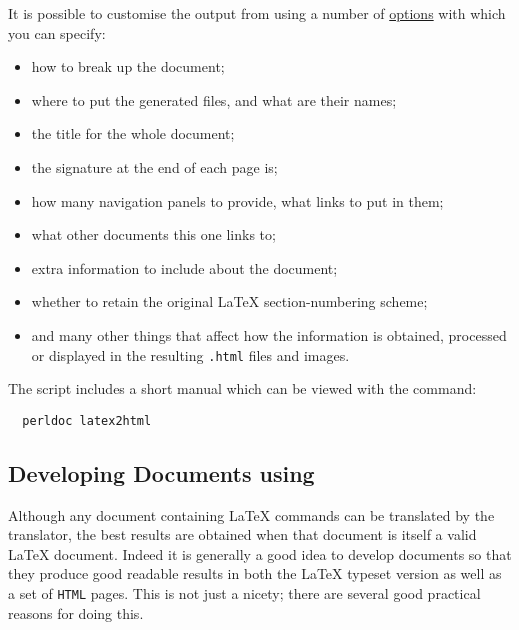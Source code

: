 \medskip
{}\html{\\}\noindent
It is possible to customise the output from \latextohtml{} using a number of 
\hyperref{command-line options}{command-line options (see Section~}{)}{options}
with which you can specify:
\begin{itemize}
\item
how to break up the document; 
\item
where to put the generated files, and what are their names;
\item
the title for the whole document; 
\item
the signature at the end of each page is; 
\item
how many navigation panels to provide, what links to put in them;
\item
what other documents this one links to;
\item 
extra information to include about the document;
\item 
whether to retain the original \LaTeX{} section-numbering scheme;
\item
and many other things that affect how the information is obtained,
processed or displayed in the resulting \texttt{.html} files and images.
\end{itemize}

\medskip
{}\html{\\}\noindent
The \latextohtml{} script includes a short manual
which can be viewed with the command: 
\begin{verbatim}
  perldoc latex2html
\end{verbatim}


\subsection{Developing Documents using \latextohtml{}\label{devel}}
%
Although any document containing \LaTeX{} commands can be translated
by the \latextohtml{} translator, the best results are obtained when
that document is itself a valid \LaTeX{} document.
Indeed it is generally a good idea to develop documents so that
they produce good readable results in both the \LaTeX{} typeset
version as well as a set of \texttt{HTML} pages.
This is not just a nicety; 
there are several good practical reasons for doing this.

